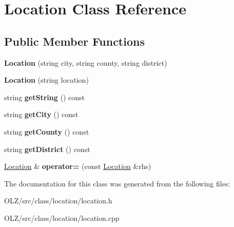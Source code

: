 \hypertarget{class_location}{}\section{Location Class Reference}
\label{class_location}
\subsection*{Public Member Functions}
\begin{DoxyCompactItemize}
\item 
\hypertarget{class_location_adde1be165887d4738c25164191107f8a}{}{\bfseries Location} (string city, string county, string district)\label{class_location_adde1be165887d4738c25164191107f8a}

\item 
\hypertarget{class_location_aa41373bb46efc066f79ab697c56b0da3}{}{\bfseries Location} (string location)\label{class_location_aa41373bb46efc066f79ab697c56b0da3}

\item 
\hypertarget{class_location_a9584236ecf93acc9192ece00583482ab}{}string {\bfseries get\+String} () const \label{class_location_a9584236ecf93acc9192ece00583482ab}

\item 
\hypertarget{class_location_ac682ee57f401c50a88d362305d159640}{}string {\bfseries get\+City} () const \label{class_location_ac682ee57f401c50a88d362305d159640}

\item 
\hypertarget{class_location_aa200afd4afd7898f16c5e54c533da4ef}{}string {\bfseries get\+County} () const \label{class_location_aa200afd4afd7898f16c5e54c533da4ef}

\item 
\hypertarget{class_location_a989ce807f112210952bad662d38185dd}{}string {\bfseries get\+District} () const \label{class_location_a989ce807f112210952bad662d38185dd}

\item 
\hypertarget{class_location_a41a15b0cfd590d365e31f613d32eebd1}{}\hyperlink{class_location}{Location} \& {\bfseries operator=} (const \hyperlink{class_location}{Location} \&rhs)\label{class_location_a41a15b0cfd590d365e31f613d32eebd1}

\end{DoxyCompactItemize}


The documentation for this class was generated from the following files\+:\begin{DoxyCompactItemize}
\item 
O\+L\+Z/src/class/location/location.\+h\item 
O\+L\+Z/src/class/location/location.\+cpp\end{DoxyCompactItemize}
